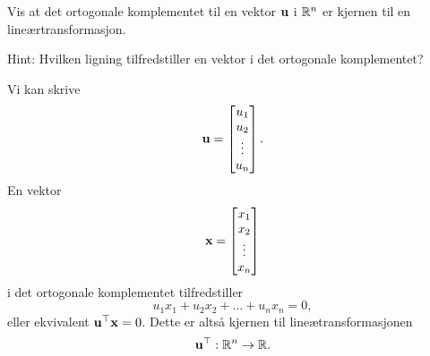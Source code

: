 

\begin{oppgave}
Vis at det ortogonale komplementet til en vektor $\mathbf{u}$ i $\mathbb{R}^n$
er kjernen til en lineærtransformasjon.

\noindent
Hint: Hvilken ligning tilfredstiller en vektor i det ortogonale komplementet?
\end{oppgave}

\begin{losning}
Vi kan skrive
\[
\mathbf{u}=\begin{bmatrix}
u_1\\
u_2\\
\vdots\\
u_n\\
\end{bmatrix}.
\]
En vektor
\[
\mathbf{x}=\begin{bmatrix}
x_1\\
x_2\\
\vdots\\
x_n\\
\end{bmatrix}
\]
i det ortogonale komplementet tilfredstiller
\[
u_1x_1+u_2x_2+\dots +u_nx_n=0,
\]
eller ekvivalent $\mathbf{u}^\top \mathbf{x}=0$.
Dette er altså kjernen til lineætransformasjonen
\[
\mathbf{u}^\top:\mathbb{R}^n\rightarrow \mathbb{R}.
\]
\end{losning}
